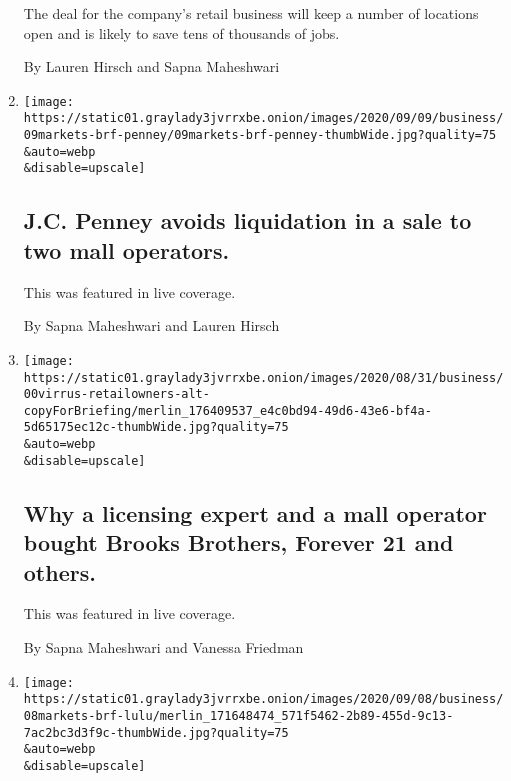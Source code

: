 \begin{enumerate}
  The deal for the company's retail business will keep a number of
  locations open and is likely to save tens of thousands of jobs.

  By Lauren Hirsch and Sapna Maheshwari
\item
  \href{/live/2020/09/09/business/stock-market-today-coronavirus/jc-penney-avoids-liquidation-in-a-sale-to-two-mall-operators}{}

  \texttt{[image: https://static01.graylady3jvrrxbe.onion/images/2020/09/09/business/09markets-brf-penney/09markets-brf-penney-thumbWide.jpg?quality=75\\\&auto=webp\\\&disable=upscale]}

  \hypertarget{jc-penney-avoids-liquidation-in-a-sale-to-two-mall-operators}{%
  \subsection{J.C. Penney avoids liquidation in a sale to two mall
  operators.}\label{jc-penney-avoids-liquidation-in-a-sale-to-two-mall-operators}}

  This was featured in live coverage.

  By Sapna Maheshwari and Lauren Hirsch
\item
  \href{/live/2020/09/09/business/stock-market-today-coronavirus/why-a-licensing-expert-and-a-mall-operator-bought-brooks-brothers-forever-21-and-others}{}

  \texttt{[image: https://static01.graylady3jvrrxbe.onion/images/2020/08/31/business/00virrus-retailowners-alt-copyForBriefing/merlin\_176409537\_e4c0bd94-49d6-43e6-bf4a-5d65175ec12c-thumbWide.jpg?quality=75\\\&auto=webp\\\&disable=upscale]}

  \hypertarget{why-a-licensing-expert-and-a-mall-operator-bought-brooks-brothers-forever-21-and-others}{%
  \subsection{Why a licensing expert and a mall operator bought Brooks
  Brothers, Forever 21 and
  others.}\label{why-a-licensing-expert-and-a-mall-operator-bought-brooks-brothers-forever-21-and-others}}

  This was featured in live coverage.

  By Sapna Maheshwari and Vanessa Friedman
\item
  \href{/live/2020/09/08/business/stock-market-today-coronavirus/lululemon-reports-a-quarterly-profit-as-consumers-flock-to-yoga-pants}{}

  \texttt{[image: https://static01.graylady3jvrrxbe.onion/images/2020/09/08/business/08markets-brf-lulu/merlin\_171648474\_571f5462-2b89-455d-9c13-7ac2bc3d3f9c-thumbWide.jpg?quality=75\\\&auto=webp\\\&disable=upscale]}


\end{enumerate}
